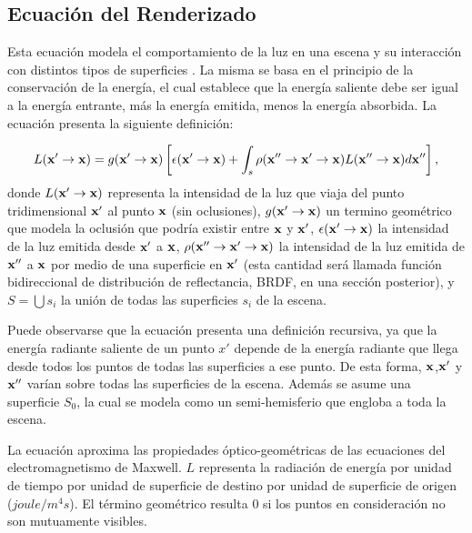 \subsection{Ecuación del Renderizado}

Esta ecuación modela el comportamiento de la luz en una escena y su interacción con distintos tipos de superficies \cite{Kajiya1986}.
La misma se basa en el principio de la conservación de la energía, el cual establece que la energía saliente debe ser igual a la energía entrante, más la energía emitida, menos la energía absorbida.
La ecuación presenta la siguiente definición:

\begin{equation}
L(\bold{x'} \rightarrow \bold{x}) =  g(\bold{x'}  \rightarrow \bold{x})  \left[ \epsilon(\bold{x'}  \rightarrow \bold{x}) + \int_{s}{\rho(\bold{x''}  \rightarrow \bold{x'}  \rightarrow \bold{x})L(\bold{x''}  \rightarrow \bold{x}) d\bold{x''}} \right],
\end{equation}
donde $L(\bold{x'} \rightarrow \bold{x})$ representa la intensidad de la luz que viaja del punto tridimensional $\bold{x'}$ al punto $\bold{x}$ (sin oclusiones), $g(\bold{x'} \rightarrow \bold{x})$ un termino geométrico que modela la oclusión que podría existir entre $\bold{x}$ y $\bold{x'}$, $\epsilon(\bold{x'} \rightarrow \bold{x})$ la intensidad de la luz emitida desde $\bold{x'}$ a $\bold{x}$, $\rho(\bold{x''}  \rightarrow \bold{x'}  \rightarrow \bold{x})$ la intensidad de la luz emitida de $\bold{x''}$ a $\bold{x}$ por medio de una superficie en $\bold{x'}$ (esta cantidad será llamada función bidireccional de distribución de reflectancia, \acrshort{BRDF}, en una sección posterior), y $S=\bigcup{s_{i}}$ la unión de todas las superficies $s_{i}$ de la escena.


Puede observarse que la ecuación presenta una definición recursiva, ya que la energía radiante saliente de un punto $x'$ depende de la energía radiante que llega desde todos los puntos de todas las superficies a ese punto.
De esta forma, $\bold{x}$,$\bold{x'}$ y $\bold{x''}$ varían sobre todas las superficies de la escena.
Además se asume una superficie $S_{0}$, la cual se modela como un semi-hemisferio que engloba a toda la escena.

La ecuación aproxima las propiedades óptico-geométricas de las ecuaciones del electromagnetismo de Maxwell.
$L$ representa la radiación de energía por unidad de tiempo por unidad de superficie de destino por unidad de superficie de origen ($joule/m^{4} s$).
El término geométrico resulta $0$ si los puntos en consideración no son mutuamente visibles.

